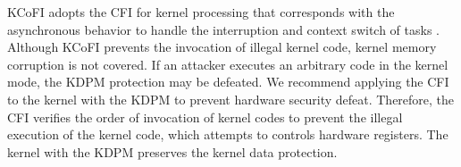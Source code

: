 KCoFI adopts the CFI for kernel processing that corresponds with the
asynchronous behavior to handle the interruption and context switch of tasks
\cite{criswell14sp}. Although KCoFI prevents the invocation of illegal kernel
code, kernel memory corruption is not covered.
%
If an attacker executes an arbitrary code in the kernel mode, the KDPM
protection may be defeated.
%
We recommend applying the CFI to the kernel with the KDPM to prevent hardware
security defeat. 
%
Therefore, the CFI verifies the order of invocation of kernel codes to prevent
the illegal execution of the kernel code, which attempts to controls hardware
registers. The kernel with the KDPM preserves the kernel data protection.








%


%


